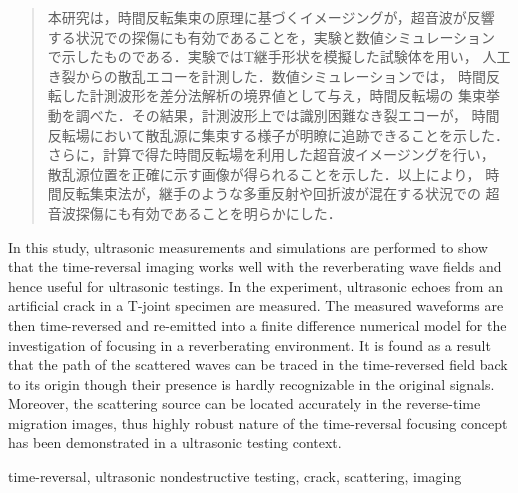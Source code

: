 \documentclass[jscefinal]{jjsce}%
\begin{document}

\begin{abstract}
本研究は，時間反転集束の原理に基づくイメージングが，超音波が反響
する状況での探傷にも有効であることを，実験と数値シミュレーション
で示したものである．実験ではT継手形状を模擬した試験体を用い，
人工き裂からの散乱エコーを計測した．数値シミュレーションでは，
時間反転した計測波形を差分法解析の境界値として与え，時間反転場の
集束挙動を調べた．その結果，計測波形上では識別困難なき裂エコーが，
時間反転場において散乱源に集束する様子が明瞭に追跡できることを示した．
さらに，計算で得た時間反転場を利用した超音波イメージングを行い，
散乱源位置を正確に示す画像が得られることを示した．以上により，
時間反転集束法が，継手のような多重反射や回折波が混在する状況での
超音波探傷にも有効であることを明らかにした．
\end{abstract}
\begin{Eabstract}
In this study, ultrasonic measurements and simulations are performed to show 
that the time-reversal imaging works well 
with the reverberating wave fields and hence useful for ultrasonic testings. 
In the experiment, ultrasonic echoes from 
an artificial crack in a T-joint specimen are measured. The measured waveforms 
are then time-reversed and re-emitted into a finite difference numerical 
model for the investigation of focusing in a reverberating environment.
It is found as a result that the path of the scattered waves can be traced 
in the time-reversed field back to its origin though their presence is hardly 
recognizable in the original signals. Moreover, the scattering source 
can be located accurately in the reverse-time migration images, 
thus highly robust nature of the time-reversal focusing concept has 
been demonstrated in a ultrasonic testing context.
\end{Eabstract}
\begin{keyword}
time-reversal, ultrasonic nondestructive testing, crack, scattering, imaging
\end{keyword}
\maketitle
\end{document}
